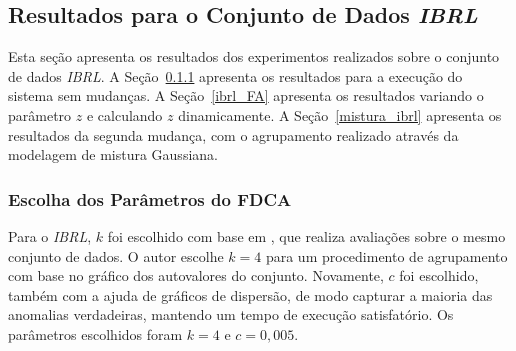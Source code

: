 \documentclass[cic,tc]{iiufrgs}
\begin{document}
\begin{table}[h]
\begin{adjustwidth}{-.5in}{-.5in}
    \caption{Avaliação do FDCA com agrupamento por modelagem de mistura Gaussiana para o conjunto de dados \textit{ISSNIP}}
    \bigskip
    \begin{center}
    \label{av_gaussian_issnip}
    \end{center}
\end{adjustwidth}
\end{table}

\subsection{Resultados para o Conjunto de Dados \textit{IBRL}}
\label{res_ibrl}
Esta seção apresenta os resultados dos experimentos realizados sobre o conjunto de dados \textit{IBRL}. A Seção~\ref{ibrl_fdca} apresenta os resultados para a execução do sistema sem mudanças. A Seção~\ref{ibrl_FA} apresenta os resultados variando o parâmetro $z$ e calculando $z$ dinamicamente. A Seção~\ref{mistura_ibrl} apresenta os resultados da segunda mudança, com o agrupamento realizado através da modelagem de mistura Gaussiana.

\subsubsection{Escolha dos Parâmetros do FDCA}
\label{ibrl_fdca}
Para o \textit{IBRL}, $k$ foi escolhido com base em \cite{Ellipsoids2009}, que realiza avaliações sobre o mesmo conjunto de dados. O autor escolhe $k = 4$ para um procedimento de agrupamento com base no gráfico dos autovalores do conjunto. Novamente, $c$ foi escolhido, também com a ajuda de gráficos de dispersão, de modo capturar a maioria das anomalias verdadeiras, mantendo um tempo de execução satisfatório. Os parâmetros escolhidos foram $k = 4$ e $c = 0,005$.
\end{document}
